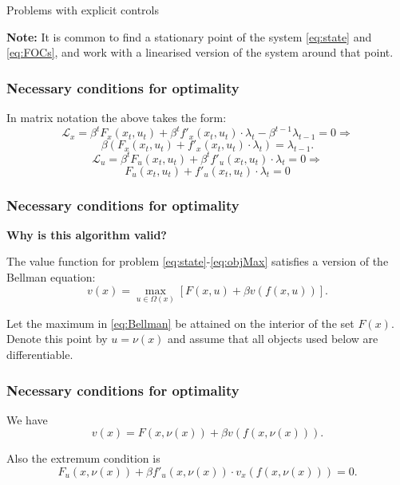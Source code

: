\documentclass[10pt]{beamer}
\theoremstyle{definition}
\begin{document}
\begin{section}{Problems with explicit controls}
\begin{frame}[fragile]
\textbf{Note:} It is common to find a stationary point of the system \eqref{eq:state} and \eqref{eq:FOCs}, and work with a linearised version of the system around that point.
\end{frame}


\begin{frame}[fragile]
\frametitle{Necessary conditions for optimality}
In matrix notation the above takes the form:
\[ \mathcal{L}_x = \beta^t F_x(x_t,u_t)+\beta^t f'_x(x_t,u_t)\cdot \lambda_t - \beta^{t-1}\lambda_{t-1} = 0 \Rightarrow \]
\begin{equation}
\beta ( F_x(x_t,u_t)+ f'_x(x_t,u_t)\cdot \lambda_t ) = \lambda_{t-1}.
\label{eq:LagrX}
\end{equation}  \bigskip
\[ \mathcal{L}_u = \beta^t F_u (x_t,u_t)+ \beta^t f'_u(x_t,u_t)\cdot \lambda_t = 0 \Rightarrow \]
\begin{equation}
F_u (x_t,u_t)+ f'_u(x_t,u_t)\cdot \lambda_t = 0
\label{eq:LagrU}
\end{equation}
\end{frame}



\begin{frame}[fragile]
\frametitle{Necessary conditions for optimality}
\textbf{Why is this algorithm valid?}\bigskip \bigskip

The value function for problem \eqref{eq:state}-\eqref{eq:objMax} satisfies a version of the Bellman equation:
\begin{equation}
v(x) = \max_{u \in \Omega(x)}  \left[
F(x,u)+\beta v(f(x,u)) \right]. \label{eq:Bellman}
\end{equation}


Let the maximum in \eqref{eq:Bellman} be attained on the interior of the set $ F(x) $. Denote this point by $ u = \nu(x) $ and assume that all objects used below are differentiable.
\end{frame}



\begin{frame}[fragile]
\frametitle{Necessary conditions for optimality}
We have \begin{equation}
 v(x) = F(x,\nu(x)) + \beta v(f(x,\nu(x))) .
\label{eq:Bellman1}
\end{equation}

Also the extremum condition is \begin{equation}
F_u(x,\nu(x)) + \beta f'_u(x,\nu(x)) \cdot v_x(f(x,\nu(x))) = 0.
\label{eq:diffCntrl}
\end{equation} 


\end{frame}
\end{section}
\end{document}
